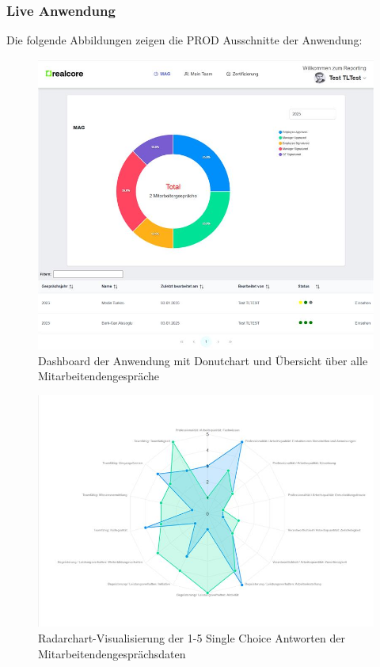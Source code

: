 \subsubsection*{Live Anwendung}
Die folgende Abbildungen zeigen die PROD Ausschnitte der Anwendung:

\begin{figure}[H]
    \centering
    \includegraphics[angle=90, width=1.0\textwidth]{images/donutchart.jpg}
    \caption{Dashboard der Anwendung mit Donutchart und Übersicht über alle Mitarbeitendengespräche}
    \label{fig:dashboard}
\end{figure}


\begin{figure}[H]
    \centering
    \includegraphics[angle=90, width=1.2\textwidth]{images/radarchart.jpg}
    \caption{Radarchart-Visualisierung der 1-5 Single Choice Antworten der Mitarbeitendengesprächsdaten}
    \label{fig:radar_chart}
\end{figure}

